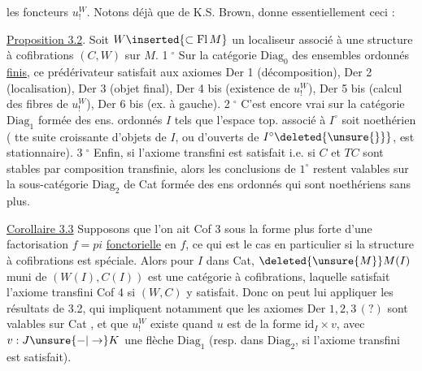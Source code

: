 les foncteurs $u^{W}_{!}$. Notons déjà que  de
K.S. Brown,  donne essentiellement ceci :

{\reversemarginpar{}}

\uline{Proposition 3.2}.  Soit $W\inserted{\subset\mathrm{Fl}\,M}$  un localiseur
associé à une structure à cofibrations
$(C,W)$ sur $M$.  \textcircled{\scriptsize 1$^\circ$} Sur la catégorie $\mathrm{Diag}_0$ des
ensembles ordonnés \uline{finis}, ce prédérivateur
satisfait aux axiomes Der 1 (décomposition),
Der 2 (localisation), Der 3 (objet final),
Der 4 bis (existence de $u^{W}_{!}$), Der 5 bis
(calcul des fibres de $u^{W}_{!}$), Der 6 bis
(ex.  à gauche). \textcircled{\scriptsize 2$^\circ$} C'est encore vrai
sur la catégorie $\mathrm{Diag}_1$  formée des ens.
ordonnés $I$  tels que l'espace
top. associé à $I^\circ$ soit noethérien ( tte
suite croissante d'objets de $I$, ou d'ouverts
de $I^\circ\deleted{\unsure{\}}}$, est stationnaire). \textcircled{\scriptsize 3$^\circ$} Enfin, si
 l'axiome transfini  est satisfait i.e.
si $C$ et $TC$ sont stables par composition
transfinie, alors les conclusions de $1^\circ$ restent
valables sur la  sous-catégorie  $\mathrm{Diag}_2$ de
Cat formée des ens ordonnés qui sont
noethériens sans plus.

\uline{Corollaire 3.3} Supposons que l'on ait Cof 3 sous
la forme plus forte d'une factorisation
$f=pi$ \uline{fonctorielle} en $f$, ce qui est le cas
en particulier si la structure à cofibrations
est spéciale. Alors pour  $I$ dans
Cat, $\deleted{\unsure{M}}M(I)$ muni de $(W(I),C(I))$ est
une catégorie à cofibrations, laquelle 
satisfait l'axiome transfini Cof 4 si
$(W,C)$ y satisfait. Donc on peut lui
appliquer les résultats de 3.2, qui
impliquent notamment que les axiomes
Der $1,2,3\,(?)$ sont valables sur Cat , et que $u^{W}_{!}$ existe quand $u$
est de la forme $\mathrm{id}_{I}\times v$, avec $v:J\unsure{-|\to}K$
une flèche  $\mathrm{Diag}_1$ (resp. dans $\mathrm{Diag}_2$, si
l'axiome transfini est satisfait).

